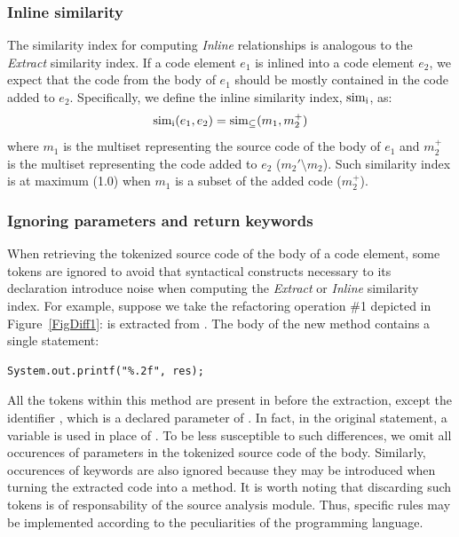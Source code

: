 \subsubsection{Inline similarity}
\label{SecSimI}

The similarity index for computing \textit{Inline} relationships is analogous to the \textit{Extract} similarity index.
If a code element $e_1$ is inlined into a code element $e_2$, we expect that the code from the body of $e_1$ should be mostly contained in the code added to $e_2$. Specifically, we define the inline similarity index, $\operatorname{sim_{i}}$, as:
\begin{align}
\operatorname{sim_{i}}(e_1, e_2) = \operatorname{sim_{\subseteq}}(m_1, m_2^+)
\end{align}
where $m_1$ is the multiset representing the source code of the body of $e_1$ and $m_2^+$ is the multiset representing the code added to $e_2$ ($m_2' \setminus m_2$). Such similarity index is at maximum (1.0) when $m_1$ is a subset of the added code ($m_2^+$).





\subsubsection{Ignoring parameters and return keywords}

When retrieving the tokenized source code of the body of a code element, some tokens are ignored to avoid that syntactical constructs necessary to its declaration
introduce noise when computing the \textit{Extract} or \textit{Inline} similarity index.
For example, suppose we take the refactoring operation \#1 depicted in Figure~\ref{FigDiff1}:  is extracted from .
The body of the new method  contains a single statement:
\begin{lstlisting}
System.out.printf("%.2f", res);
\end{lstlisting}
All the tokens within this method are present in  before the extraction, except the identifier , which is a declared parameter of . In fact, in the original statement, a variable  is used in place of . To be less susceptible to such differences, we omit all occurences of parameters in the tokenized source code of the body. Similarly, occurences of  keywords are also ignored because they may be introduced when turning the extracted code into a method.
It is worth noting that discarding such tokens is of responsability of the source analysis module. Thus, specific rules may be implemented according to the peculiarities of the programming language.
